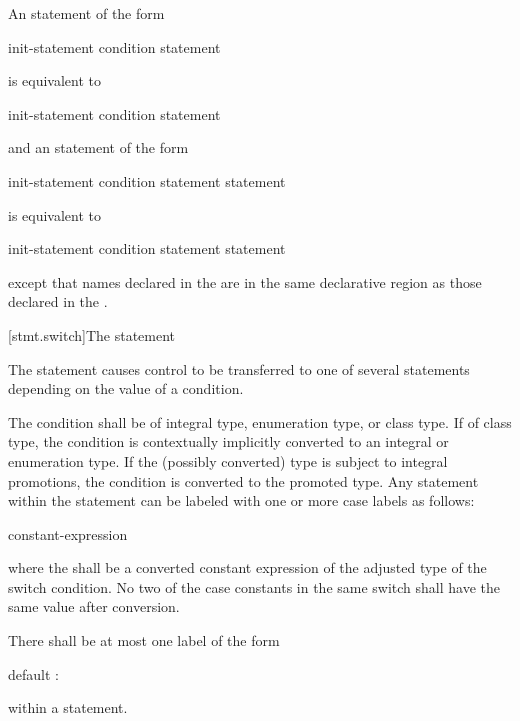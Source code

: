 \pnum
An  statement of the form
\begin{ncsimplebnf}
  \terminal{(} init-statement condition \terminal{)} statement
\end{ncsimplebnf}
is equivalent to
\begin{ncsimplebnf}
\terminal{\{}\br
\bnfindent init-statement\br
\bnfindent {}  \terminal{(} condition \terminal{)} statement\br
\terminal{\}}
\end{ncsimplebnf}
and an  statement of the form
\begin{ncsimplebnf}
  \terminal{(} init-statement condition \terminal{)} statement  statement
\end{ncsimplebnf}
is equivalent to
\begin{ncsimplebnf}
\terminal{\{}\br
\bnfindent init-statement\br
\bnfindent {}  \terminal{(} condition \terminal{)} statement  statement\br
\terminal{\}}
\end{ncsimplebnf}
except that names declared in the  are in
the same declarative region as those declared in the
.

[stmt.switch]{The  statement}%

\pnum
The  statement causes control to be transferred to one of
several statements depending on the value of a condition.

\pnum
The condition shall be of integral type, enumeration type, or class
type. If of class type, the
condition is contextually implicitly converted to
an integral or enumeration type.
If the (possibly converted) type is subject to integral
promotions, the condition is converted
to the promoted type.
Any
statement within the  statement can be labeled with one or
more case labels as follows:
\begin{ncbnf}
%
 constant-expression \terminal{:}
\end{ncbnf}
where the  shall be
a converted constant expression of the
adjusted type of the switch condition. No two of the case constants in
the same switch shall have the same value after conversion.

\pnum
{}%
There shall be at most one label of the form
\begin{codeblock}
default :
\end{codeblock}
within a  statement.

